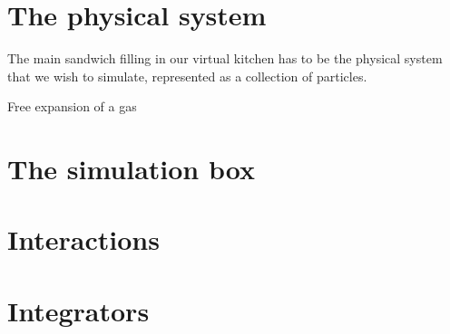 \section{The physical system}

The main sandwich filling in our virtual kitchen has to be the physical system
that we wish to simulate, represented as a collection of particles.

Free expansion of a gas

\section{The simulation box}

\section{Interactions}

\section{Integrators}


